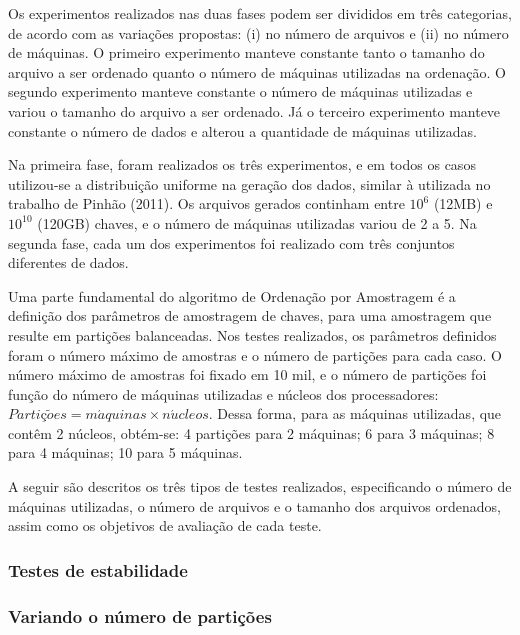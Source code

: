 
Os experimentos realizados nas duas fases podem ser divididos em três categorias, de acordo com as variações propostas: (i) no número de arquivos e (ii) no número de máquinas. 
O primeiro experimento manteve constante tanto o tamanho do arquivo a ser ordenado quanto o número de máquinas utilizadas na ordenação. 
O segundo experimento manteve constante o número de máquinas utilizadas e variou o tamanho do arquivo a ser ordenado. 
Já o terceiro experimento manteve constante o número de dados e alterou a quantidade de máquinas utilizadas. 

Na primeira fase, foram realizados os três experimentos, e em todos os casos utilizou-se a distribuição uniforme na geração dos dados, similar à utilizada no trabalho de Pinhão (2011). Os arquivos gerados continham entre $10^{6}$ (12MB) e  $10^{10}$ (120GB) chaves, e o número de máquinas utilizadas variou de 2 a 5.
Na segunda fase, cada um dos experimentos foi realizado com três conjuntos diferentes de dados.


Uma parte fundamental do algoritmo de Ordenação por Amostragem é a definição dos parâmetros de amostragem de chaves, para uma amostragem que resulte em partições balanceadas. Nos testes realizados, os parâmetros definidos foram o número máximo de amostras e o número de partições para cada caso.  O número máximo de amostras foi fixado em 10 mil, e o número de partições foi função do número de máquinas utilizadas e núcleos dos processadores: \mbox{$ Parti \text{\c{c}} \tilde{o}es = m\acute{a}quinas \times n\acute{u}cleos $}. Dessa forma, para as máquinas utilizadas, que contêm 2 núcleos, obtém-se: 4 partições para 2 máquinas; 6 para 3 máquinas; 8 para 4 máquinas; 10 para 5 máquinas.

A seguir são descritos os três tipos de testes realizados, especificando o número de máquinas utilizadas, o número de arquivos e o tamanho dos arquivos ordenados, assim como os objetivos de avaliação de cada teste.

\subsubsection{Testes de estabilidade}

\subsubsection{Variando o número de partições}

